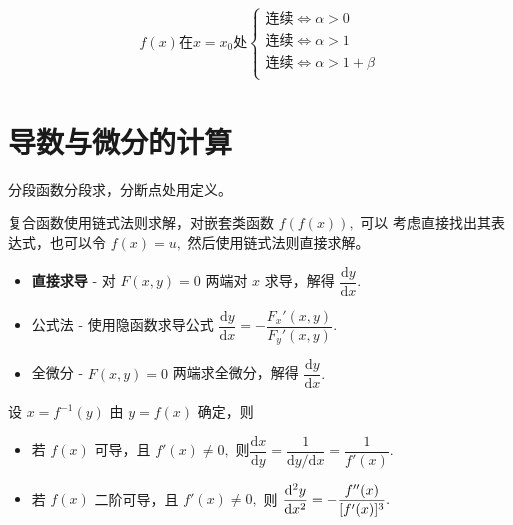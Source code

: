 \begin{equation*}
    \begin{aligned}
        f(x)\textrm{在}x = x_0 \textrm{处}
        \begin{cases}
            \textrm{连续} \Leftrightarrow \alpha > 0\\ 
            \textrm{连续} \Leftrightarrow \alpha > 1\\ 
            \textrm{连续} \Leftrightarrow \alpha > 1 + \beta\\ 
        \end{cases}
    \end{aligned}
\end{equation*}

\section{导数与微分的计算}


分段函数分段求，分断点处用定义。


复合函数使用链式法则求解，对嵌套类函数 $ f(f(x)), $ 可以
考虑直接找出其表达式，也可以令 $ f(x) = u, $ 然后使用链式法则直接求解。


\begin{itemize}
    \item \textbf{直接求导} - 对 $ F(x,y) = 0 $ 两端对 $ x $ 求导，解得 $ \dfrac{\mathrm{d}y}{\mathrm{d}x}. $ 
    \item 公式法 - 使用隐函数求导公式 $ \dfrac{\mathrm{d}y}{\mathrm{d}x} = -\dfrac{F_x'(x,y)}{F_y'(x,y)}. $
    \item 全微分 - $ F(x,y) = 0 $ 两端求全微分，解得 $ \dfrac{\mathrm{d}y}{\mathrm{d}x}. $  
\end{itemize}


设 $ x = f^{-1}(y) $ 由 $ y = f(x) $ 确定，则
\begin{itemize}
    \item 若 $ f(x) $ 可导，且 $ f'(x)\neq 0, $ 则$ \dfrac{\mathrm{d}x}{\mathrm{d}y} = 
    \dfrac{1}{\mathrm{d}y/\mathrm{d}x} = \dfrac{1}{f'(x)}. $ 
    \item 若 $ f(x) $ 二阶可导，且 $ f'(x)\neq 0, $ 则
    $ \dfrac{\mathrm{d}^2y}{\mathrm{d}x^2} = -\dfrac{f^{\prime\prime}(x)}{[f'(x)]^3}. $ 
\end{itemize}

